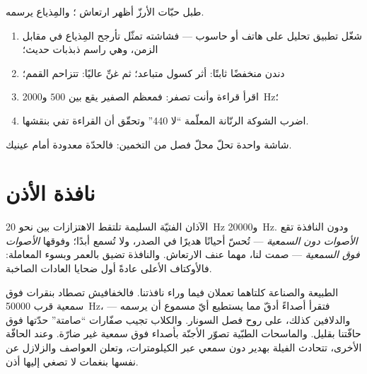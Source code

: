 \begin{method}\label{met:g8:sound-pitch-loudness:seeing}
طبل حبّات الأرزّ أظهر ارتعاش ؛ والمِذياع يرسمه.
\begin{enumerate}
  \item شغّل تطبيق تحليل  على هاتف أو حاسوب --- فشاشته
        تمثّل تأرجح المِذياع في مقابل الزمن، وهي راسم ذبذبات
        حديث؛
  \item دندن منخفضًا ثابتًا: أثر كسول متباعد؛ ثم غنِّ عاليًا:
        تتزاحم القمم؛
  \item اقرأ قراءة  وأنت تصفر: فمعظم الصفير يقع بين
        $500$ و\qty{2000}{Hz}؛
  \item اضرب الشوكة الرنّانة المعلّمة ``لا 440'' وتحقّق أن
        القراءة تفي بنقشها.
\end{enumerate}
شاشة واحدة تحلّ محلّ فصل من التخمين: فالحدّة معدودة أمام
عينيك.
\end{method}

\section{نافذة الأذن}

\begin{proposition}\label{prop:g8:sound-pitch-loudness:range}
الآذان الفتيّة السليمة تلتقط الاهتزازات بين نحو \qty{20}{Hz}
و\qty{20000}{Hz}. ودون النافذة تقع \emph{الأصوات دون
السمعية} --- تُحسّ أحيانًا هديرًا في
الصدر، ولا تُسمع أبدًا؛ وفوقها \emph{الأصوات فوق
السمعية} --- صمت لنا، مهما عنف الارتعاش.
والنافذة تضيق بالعمر وبسوء المعاملة: فالأوكتاف الأعلى عادةً
أول ضحايا العادات الصاخبة.
\end{proposition}

\begin{example}\label{ex:g8:sound-pitch-loudness:beyond}
الطبيعة والصناعة كلتاهما تعملان فيما وراء نافذتنا. فالخفافيش
تصطاد بنقرات فوق سمعية قرب \qty{50000}{Hz}، فتقرأ أصداءً أدقّ
مما يستطيع أيّ  مسموع أن يرسمه --- والدلافين كذلك، على
روح فصل السونار. والكلاب تجيب صفّارات ``صامتة'' حدّتها فوق
حافّتنا بقليل. والماسحات الطبّية تصوّر الأجنّة بأصداء فوق
سمعية غير ضارّة. وعند الحافّة الأخرى، تتحادث الفيلة بهدير دون
سمعي عبر الكيلومترات، وتعلن العواصف والزلازل عن نفسها بنغمات
لا تصغي إليها أذن.
\end{example}

